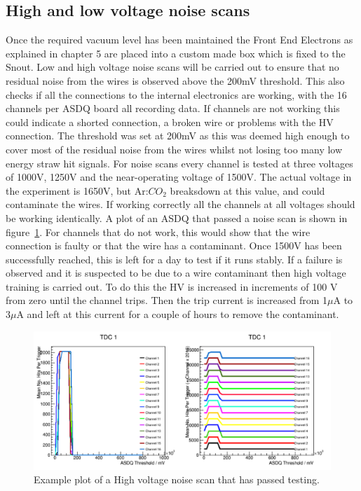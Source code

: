 \subsection{ High and low voltage noise scans}

Once the required vacuum level has been maintained the Front End Electrons as explained in chapter 5 are placed into a custom made box which is fixed to the Snout. Low and high voltage noise scans will be carried out to ensure that no residual noise from the wires is observed above the 200mV threshold. This also checks if all the connections to the internal electronics are working, with the 16 channels per ASDQ board all recording data. If channels are not working this could indicate a shorted connection, a broken wire or problems with the HV connection. The threshold was set at 200mV as this was deemed high enough to cover most of the residual noise from the wires whilst not losing too many low energy straw hit signals. For noise scans every channel is tested at three voltages of 1000V, 1250V and the near-operating voltage of 1500V. The actual voltage in the experiment is 1650V, but Ar:$CO_2$ breaksdown at this value, and could contaminate the wires. If working correctly all the channels at all voltages should be working identically. A plot of an ASDQ that passed a noise scan is shown in figure~\ref{fig:HighVNoiseScans}. For channels that do not work, this would show that the wire connection is faulty or that the wire has a contaminant. Once 1500V has been successfully reached, this is left for a day to test if it runs stably. If a failure is observed and it is suspected to be due to a wire contaminant then high voltage training is carried out. To do this the HV is increased in increments of 100 V from zero until the channel trips. Then the trip current is increased from 1$\mu$A to 3$\mu$A and left at this current for a couple of hours to remove the contaminant.

\begin{figure}[ht]
\centering
\includegraphics[scale=0.8]{Figures/HighVNoiseScans}
\decoRule
\caption{Example plot of a High voltage noise scan that has passed testing.}
\label{fig:HighVNoiseScans}
\end{figure}

